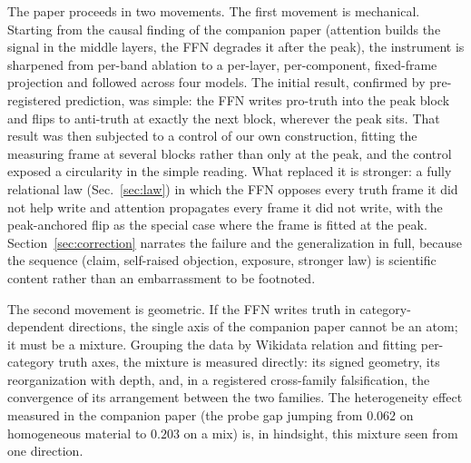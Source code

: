 \documentclass[11pt]{article}
\begin{document}
The paper proceeds in two movements. The first movement is mechanical.
Starting from the causal finding of the companion paper (attention builds the
signal in the middle layers, the FFN degrades it after the peak), the
instrument is sharpened from per-band ablation to a per-layer, per-component,
fixed-frame projection and followed across four models. The initial result,
confirmed by pre-registered prediction, was simple: the FFN writes pro-truth
into the peak block and flips to anti-truth at exactly the next block,
wherever the peak sits. That result was then subjected to a control of our
own construction, fitting the measuring frame at several blocks rather than
only at the peak, and the control exposed a circularity in the simple
reading. What replaced it is stronger: a fully relational law
(Sec.~\ref{sec:law}) in which the FFN opposes every truth frame it did not
help write and attention propagates every frame it did not write, with the
peak-anchored flip as the special case where the frame is fitted at the peak.
Section~\ref{sec:correction} narrates the failure and the generalization in
full, because the sequence (claim, self-raised objection, exposure, stronger
law) is scientific content rather than an embarrassment to be footnoted.

The second movement is geometric. If the FFN writes truth in
category-dependent directions, the single axis of the companion paper cannot
be an atom; it must be a mixture. Grouping the data by Wikidata relation and
fitting per-category truth axes, the mixture is measured directly: its signed
geometry, its reorganization with depth, and, in a registered cross-family
falsification, the convergence of its arrangement between the two families.
The heterogeneity effect measured in the companion paper (the probe gap
jumping from $0.062$ on homogeneous material to $0.203$ on a mix) is, in
hindsight, this mixture seen from one direction.
\end{document}
